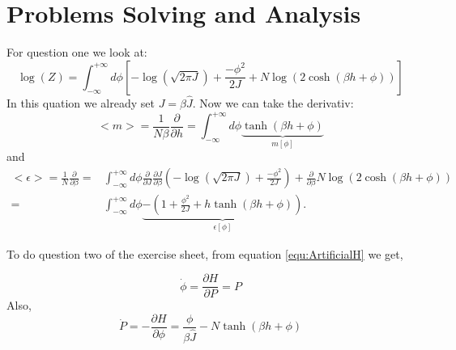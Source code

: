\documentclass[11pt, a4paper, DIV=12]{scrartcl}
\begin{document}
\section{Problems Solving and Analysis}
For question one we look at:
\begin{equation}
	\log(Z)=\int_{-\infty}^{+\infty}d\phi\left[-\log(\sqrt{2\pi  J})+\frac{-\phi^2}{2  J}+N\log(2\cosh(\beta h+\phi))\right]
\end{equation}
In this quation we already set $J=\beta\hat{J}$. Now we can take the derivativ:
\begin{equation}
	<m>=\frac{1}{N\beta}\frac{\partial}{\partial h}=\int_{-\infty}^{+\infty}d\phi\underbrace{\tanh(\beta h+\phi)}_{m[\phi]}
\end{equation}
and
\begin{align}
	<\epsilon>=\frac{1}{N}\frac{\partial}{\partial \beta}=&\int_{-\infty}^{+\infty}d\phi\frac{\partial}{\partial J}\frac{\partial J}{\partial \beta}\left(-\log(\sqrt{2\pi J})+\frac{-\phi^2}{2 J}\right)+\frac{\partial}{\partial \beta}N\log(2\cosh(\beta h+\phi))\\
	=& \int_{-\infty}^{+\infty}d\phi \underbrace{-\left(1+\frac{\phi^2}{2 J}+h \tanh(\beta h+\phi)\right)}_{\epsilon[\phi]}\text{.}
\end{align}

To do question two of the exercise sheet, from equation \ref{equ:ArtificialH} we get,

\begin{equation}
\dot{\phi}=\frac{\partial H}{\partial P}= P
\end{equation}
Also,
\begin{equation}
\dot{P}=-\frac{\partial H}{\partial \phi}= \frac{\phi}{\beta \hat{J}} - N \tanh(\beta h+ \phi)
\end{equation}
\end{document}
